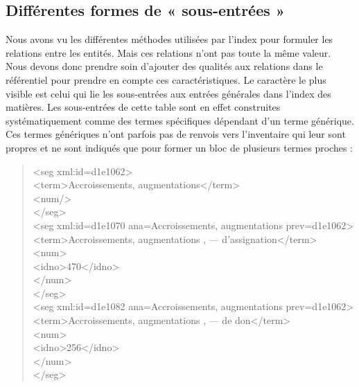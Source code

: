 \documentclass[a4paper,12pt,twoside]{book}
\begin{document}
	\subsection{Différentes formes de « sous-entrées »}
	
	Nous avons vu les différentes méthodes utilisées par l'index pour formuler les relations entre les entités. Mais ces relations n'ont pas toute la même valeur. Nous devons donc prendre soin d'ajouter des qualités aux relations dans le référentiel pour prendre en compte ces caractéristiques. Le caractère le plus visible est celui qui lie les sous-entrées aux entrées générales dans l'index des matières. Les sous-entrées de cette table sont en effet construites systématiquement comme des termes spécifiques dépendant d'un terme générique. Ces termes génériques n'ont parfois pas de renvois vers l'inventaire qui leur sont propres et ne sont indiqués que pour former un bloc de plusieurs termes proches :
	
	\begin{quotation}
		<seg xml:id=\textquotesingle d1e1062\textquotesingle >\\
		\indent{}Accroissements, augmentations</term>\\
		\indent{}\\
		\\
		\indent<seg xml:id=\textquotesingle d1e1070\textquotesingle{} ana=\textquotesingle Accroissements, augmentations\textquotesingle{} prev=\textquotesingle d1e1062\textquotesingle >\\
		\indent{}Accroissements, augmentations , — d'assignation</term>\\
		\indent\indent<num>\\
		\indent\indent{}470</idno>\\
		\indent{}\\
		\\
		\indent<seg xml:id=\textquotesingle d1e1082\textquotesingle{} ana=\textquotesingle Accroissements, augmentations\textquotesingle{} prev=\textquotesingle d1e1062\textquotesingle >\\
		\indent{}Accroissements, augmentations , — de don</term>\\
		\indent\indent<num>\\
		\indent\indent{}256</idno>\\
		\indent{}\\
	\end{quotation}
	
\end{document}
